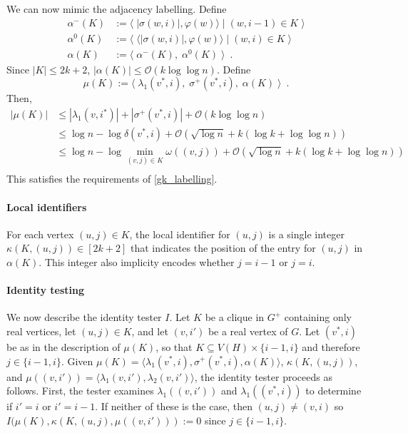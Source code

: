 \documentclass{patmorin}
\renewcommand{\le}{\leqslant}
\newcommand{\Oh}{\mathcal{O}}
\begin{document}
  We can now mimic the adjacency labelling.  Define
  \begin{align*}
    \alpha^-(K) & := \langle\; |\sigma(w,i)|, \varphi(w)\rangle \mid (w,i-1)\in K \;\rangle \\
    \alpha^0(K) & := \langle\; \langle |\sigma(w,i)|, \varphi(w)\rangle \mid (w,i)\in K \;\rangle \\
    \alpha(K)
    & := \langle\; \alpha^-(K),\; \alpha^0(K)  \;\rangle \enspace .
  \end{align*}
  Since $|K|\le 2k+2$, $|\alpha(K)|\le\Oh(k\log\log n)$.  Define
  \[
     \mu(K) := \langle\; \lambda_1(v^*,i),\; \sigma^+(v^*,i),\; \alpha(K) \;\rangle \enspace .
  \]
  Then, 
  \begin{align*}
    |\mu(K)|
    & \le |\lambda_1(v,i^*)| + |\sigma^+(v^*,i)| + \Oh(k \log\log n) \\
    & \le \log n - \log\delta(v^*,i) + \Oh(\sqrt{\log n} + k(\log k+\log\log n)) \\
    & \le \log n - \log\min_{(v,j)\in K}\omega((v,j)) + \Oh(\sqrt{\log n} + k(\log k+\log\log n)) \\
  \end{align*}
  This satisfies the requirements of \cref{gk_labelling}.

  \paragraph{Local identifiers}

  For each vertex $(u,j)\in K$, the local identifier for $(u,j)$ is a single integer $\kappa(K,(u,j))\in[2k+2]$ that indicates the position of the entry for $(u,j)$ in $\alpha(K)$.  This integer also implicity encodes whether $j=i-1$  or $j=i$.


  \paragraph{Identity testing}

  We now describe the identity tester $I$.  Let $K$ be a clique in $G^+$ containing only real vertices, let $(u,j)\in K$, and let $(v,i')$ be a real vertex of $G$.  Let $(v^*,i)$ be as in the description of $\mu(K)$, so that $K\subseteq V(H)\times\{i-1,i\}$ and therefore $j\in\{i-1,i\}$.   Given $\mu(K)=\langle\lambda_1(v^*,i),\sigma^+(v^*,i),\alpha(K)\rangle$, $\kappa(K,(u,j))$, and $\mu((v,i'))=\langle \lambda_1(v,i'),\lambda_2(v,i')\rangle$, the identity tester proceeds as follows. First, the tester examines $\lambda_1((v,i'))$ and $\lambda_1((v^*,i))$ to determine if $i'=i$ or $i'=i-1$.  If neither of these is the case, then $(u,j)\neq (v,i)$ so $I(\mu(K),\kappa(K,(u,j),\mu((v,i'))):=0$ since $j\in\{i-1,i\}$.
  
\end{document}
